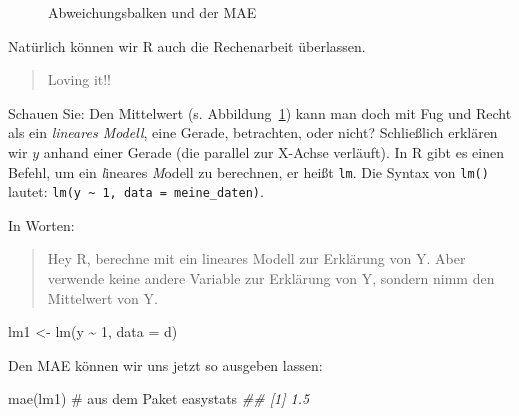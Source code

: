 \documentclass[
  letterpaper,
  oneside,
  open=any]{scrbook}
\newenvironment{Shaded}{\begin{snugshade}}{\end{snugshade}}
\newcommand{\AttributeTok}[1]{\textcolor[rgb]{0.40,0.45,0.13}{#1}}
\newcommand{\CommentTok}[1]{\textcolor[rgb]{0.37,0.37,0.37}{#1}}
\newcommand{\DecValTok}[1]{\textcolor[rgb]{0.68,0.00,0.00}{#1}}
\newcommand{\DocumentationTok}[1]{\textcolor[rgb]{0.37,0.37,0.37}{\textit{#1}}}
\newcommand{\FunctionTok}[1]{\textcolor[rgb]{0.28,0.35,0.67}{#1}}
\newcommand{\NormalTok}[1]{\textcolor[rgb]{0.00,0.23,0.31}{#1}}
\newcommand{\OtherTok}[1]{\textcolor[rgb]{0.00,0.23,0.31}{#1}}
\newcommand{\SpecialCharTok}[1]{\textcolor[rgb]{0.37,0.37,0.37}{#1}}
\theoremstyle{definition}
\theoremstyle{definition}
\theoremstyle{definition}
\theoremstyle{remark}
\begin{document}
\begin{figure}


\caption{\label{fig-mae}Abweichungsbalken und der MAE}

\end{figure}%

Natürlich können wir R auch die Rechenarbeit überlassen.

\begin{quote}
{} Loving it!!
\end{quote}

Schauen Sie: Den Mittelwert (s. Abbildung~\ref{fig-mae}) kann man doch
mit Fug und Recht als ein \emph{lineares Modell}, eine Gerade,
betrachten, oder nicht? Schließlich erklären wir \(y\) anhand einer
Gerade (die parallel zur X-Achse verläuft). In R gibt es einen Befehl,
um ein \emph{l}ineares \emph{M}odell zu berechnen, er heißt \texttt{lm}.
Die Syntax von \texttt{lm()} lautet:
\texttt{lm(y\ \textasciitilde{}\ 1,\ data\ =\ meine\_daten)}.

In Worten:

\begin{quote}
Hey R, berechne mit ein lineares Modell zur Erklärung von Y. Aber
verwende keine andere Variable zur Erklärung von Y, sondern nimm den
Mittelwert von Y.
\end{quote}

\begin{Shaded}
\begin{Highlighting}[]
\NormalTok{lm1 }\OtherTok{\textless{}{-}} \FunctionTok{lm}\NormalTok{(y }\SpecialCharTok{\textasciitilde{}} \DecValTok{1}\NormalTok{, }\AttributeTok{data =}\NormalTok{ d)}
\end{Highlighting}
\end{Shaded}

Den MAE können wir uns jetzt so ausgeben lassen:

\begin{Shaded}
\begin{Highlighting}[]
\FunctionTok{mae}\NormalTok{(lm1)  }\CommentTok{\# aus dem Paket easystats}
\DocumentationTok{\#\# [1] 1.5}
\end{Highlighting}
\end{Shaded}
\end{document}
